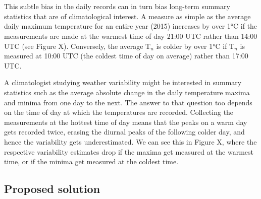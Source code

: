 \documentclass[letter]{article}
\newcommand{\T}{\mathrm{T}}
\newcommand{\Tn}{\T_{n}}
\begin{document}
    		

    			
    \begin{figure}[tbh]
    \begin{center}
    \end{center}
    { \hspace*{\fill} \\}
	\end{figure}
    
    		

    			
    \begin{figure}[tbh]
    \begin{center}
    \end{center}
    { \hspace*{\fill} \\}
	\end{figure}
    
    		
    	This subtle bias in the daily records can in turn bias long-term summary
statistics that are of climatological interest. A measure as simple as
the average daily maximum temperature for an entire year (2015)
increases by over 1°C if the measurements are made at the warmest time
of day 21:00 UTC rather than 14:00 UTC (see Figure X). Conversely, the
average \(\Tn\) is colder by over 1°C if \(\Tn\) is measured at 10:00
UTC (the coldest time of day on average) rather than 17:00 UTC.

A climatologist studying weather variability might be interested in
summary statistics such as the average absolute change in the daily
temperature maxima and minima from one day to the next. The answer to
that question too depends on the time of day at which the temperatures
are recorded. Collecting the measurements at the hottest time of day
means that the peaks on a warm day gets recorded twice, erasing the
diurnal peaks of the following colder day, and hence the variability
gets underestimated. We can see this in Figure X, where the respective
variability estimates drop if the maxima get measured at the warmest
time, or if the minima get measured at the coldest time.
    


    	\subsection{Proposed solution}\label{proposed-solution}
\end{document}
